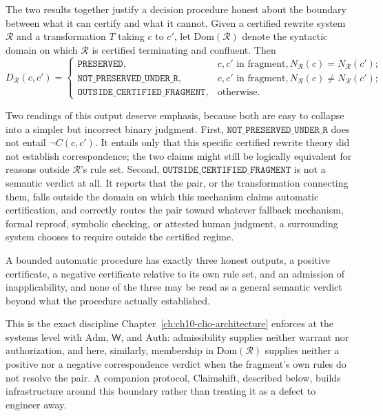 The two results together justify a decision procedure honest about the boundary between what it can certify and what it cannot. Given a certified rewrite system $\mathcal{R}$ and a transformation $T$ taking $c$ to $c'$, let $\mathrm{Dom}(\mathcal{R})$ denote the syntactic domain on which $\mathcal{R}$ is certified terminating and confluent. Then
\[
D_{\mathcal{R}}(c,c') = \begin{cases}
\mathtt{PRESERVED}, & c,c' \text{ in fragment}, N_{\mathcal{R}}(c) = N_{\mathcal{R}}(c'); \\
\mathtt{NOT\_PRESERVED\_UNDER\_R}, & c,c' \text{ in fragment}, N_{\mathcal{R}}(c) \neq N_{\mathcal{R}}(c'); \\
\mathtt{OUTSIDE\_CERTIFIED\_FRAGMENT}, & \text{otherwise}.
\end{cases}
\]

Two readings of this output deserve emphasis, because both are easy to collapse into a simpler but incorrect binary judgment. First, $\mathtt{NOT\_PRESERVED\_UNDER\_R}$ does not entail $\neg C(c,c')$. It entails only that this specific certified rewrite theory did not establish correspondence; the two claims might still be logically equivalent for reasons outside $\mathcal{R}$'s rule set. Second, $\mathtt{OUTSIDE\_CERTIFIED\_FRAGMENT}$ is not a semantic verdict at all. It reports that the pair, or the transformation connecting them, falls outside the domain on which this mechanism claims automatic certification, and correctly routes the pair toward whatever fallback mechanism, formal reproof, symbolic checking, or attested human judgment, a surrounding system chooses to require outside the certified regime.

\begin{proposition}
A bounded automatic procedure has exactly three honest outputs, a positive certificate, a negative certificate relative to its own rule set, and an admission of inapplicability, and none of the three may be read as a general semantic verdict beyond what the procedure actually established.
\end{proposition}

This is the exact discipline Chapter~\ref{ch:ch10-clio-architecture} enforces at the systems level with $\mathrm{Adm}$, $\mathsf{W}$, and $\mathrm{Auth}$: admissibility supplies neither warrant nor authorization, and here, similarly, membership in $\mathrm{Dom}(\mathcal{R})$ supplies neither a positive nor a negative correspondence verdict when the fragment's own rules do not resolve the pair. A companion protocol, Claimshift, described below, builds infrastructure around this boundary rather than treating it as a defect to engineer away.

